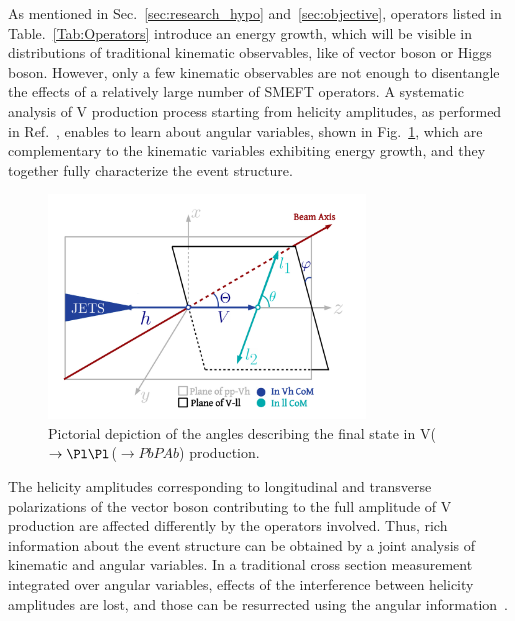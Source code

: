 \documentclass[a4paper,11pt]{article}
\renewcommand{\PV}{{{{V}}}\xspace}
\newcommand{\VH}{{{\PV}{\PH}}\xspace}
\begin{document}
As mentioned in Sec.~\ref{sec:research_hypo} and~\ref{sec:objective}, operators listed in Table.~\ref{Tab:Operators} introduce an energy growth, which will be visible in distributions of traditional kinematic observables, like \pt of vector boson or Higgs boson. 
However, only a few kinematic observables are not enough to disentangle the effects of a relatively large number of SMEFT operators. 
A systematic analysis of \VH production process starting from helicity amplitudes, 
as performed in Ref.~\cite{Banerjee:2019twi}, 
enables to learn about angular variables, shown in Fig.~\ref{fig:HelicityFrame}, 
which are complementary to the kinematic variables exhibiting energy growth, and 
they together fully characterize the event structure.
\begin{figure}[hbtp]
\begin{center}
\includegraphics[width=0.75\textwidth]{Figures/LHE/TheThreeAnglesVh.pdf}
\end{center}
\caption{
Pictorial depiction of the angles describing the final state in \PV($\to \Pl \Pl$\PH($\to Pb PAb$) production.
}
\label{fig:HelicityFrame}
\end{figure}
The helicity amplitudes corresponding to longitudinal and transverse polarizations of the vector boson contributing to the full amplitude of \VH production are affected differently by the operators involved.
Thus, rich information about the event structure can be obtained by a joint analysis of kinematic and angular variables.
In a traditional cross section measurement integrated over angular variables, 
effects of the interference between helicity amplitudes are lost, and those can be resurrected using the angular information~\cite{Panico:2017frx}.
\end{document}
